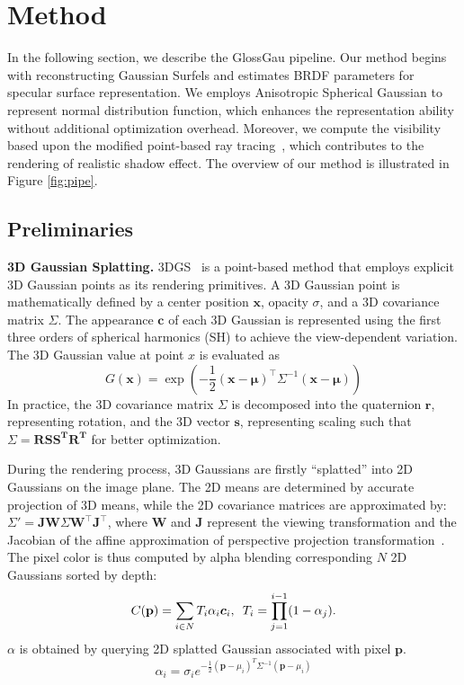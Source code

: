 \section{Method}

In the following section, we describe the GlossGau pipeline. Our method begins with reconstructing Gaussian Surfels and estimates BRDF parameters for specular surface representation. We employs Anisotropic Spherical Gaussian to represent normal distribution function, which enhances the representation ability without additional optimization overhead. Moreover, we compute the visibility based upon the modified point-based ray tracing~\cite{gao2023relightable}, which contributes to the rendering of realistic shadow effect. The overview of our method is illustrated in Figure \ref{fig:pipe}.


\subsection{Preliminaries}
\textbf{3D Gaussian Splatting.} 3DGS~\cite{kerbl20233d} is a point-based method that employs explicit 3D Gaussian points as its rendering primitives. A 3D Gaussian point is mathematically defined by a center position $\boldsymbol{x}$, opacity $\sigma$, and a 3D covariance matrix $\Sigma$. The appearance $\boldsymbol{c}$ of each 3D Gaussian is represented using the first three orders of spherical harmonics (SH) to achieve the view-dependent variation. The 3D Gaussian value at point $x$ is evaluated as
\begin{equation}
G(\boldsymbol{x}) = \exp(-\frac{1}{2}(\boldsymbol{x}-\boldsymbol{\mu})^\top\Sigma^{-1}(\boldsymbol{x}-\boldsymbol{\mu}))
\label{eq:3d_gaussian}
\end{equation}
In practice, the 3D covariance matrix $\Sigma$ is decomposed into the quaternion $\boldsymbol{r}$, representing rotation, and the 3D vector $\boldsymbol{s}$, representing scaling such that $\Sigma = \boldsymbol{R}\boldsymbol{S}\boldsymbol{S^T}\boldsymbol{R^T}$ for better optimization. 

During the rendering process, 3D Gaussians are firstly ``splatted'' into 2D Gaussians on the image plane. The 2D means are determined by accurate projection of 3D means, while the 2D covariance matrices are approximated by:
$\Sigma'=\boldsymbol{J}\boldsymbol{W}\Sigma\boldsymbol{W}^\top\boldsymbol{J}^\top$,
where $\boldsymbol{W}$ and $\boldsymbol{J}$ represent the viewing transformation and the Jacobian of the affine approximation of perspective projection transformation~\cite{zwicker2001surface}. The pixel color is thus computed by alpha blending corresponding $N$ 2D Gaussians sorted by depth:
\begin{equation}
C(\textbf{p}) = \sum_{i\in{N}}T_{i}\alpha_{i}\boldsymbol{c}_{i}, \hspace{0.5em} T_i = \prod_{j=1}^{i-1}(1-\alpha_{j}) .
    \label{eq:alpha_blending}
\end{equation}
$\alpha$ is obtained by querying 2D splatted Gaussian associated with pixel $\textbf{p}$. 
\begin{equation}
    \alpha_i = \sigma_i e^{-\frac{1}{2} (\textbf{p} - \mu_i)^T \Sigma^{-1} (\textbf{p} - \mu_i) }
\end{equation}


